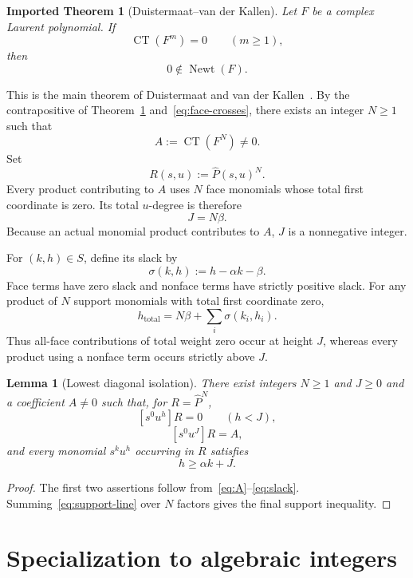 \documentclass[11pt]{article}
\newtheorem{lemma}[theorem]{Lemma}
\newtheorem{imported}[theorem]{Imported Theorem}
\theoremstyle{remark}
\newcommand{\CT}{\operatorname{CT}}
\newcommand{\Newt}{\operatorname{Newt}}
\begin{document}
\begin{imported}[Duistermaat--van der Kallen]\label{thm:DvK}
Let $F$ be a complex Laurent polynomial. If
\[
\CT(F^m)=0
\qquad(m\ge1),
\]
then
\[
0\notin\Newt(F).
\]
\end{imported}

This is the main theorem of Duistermaat and van der Kallen~\cite{DvK}. By the contrapositive of Theorem~\ref{thm:DvK} and~\eqref{eq:face-crosses}, there exists an integer $N\ge1$ such that
\begin{equation}\label{eq:A}
A
:=
\CT(F^N)
\ne0.
\end{equation}
Set
\begin{equation}\label{eq:R}
R(s,u):=\widehat P(s,u)^N.
\end{equation}
Every product contributing to $A$ uses $N$ face monomials whose total first coordinate is zero. Its total $u$-degree is therefore
\begin{equation}\label{eq:J}
J=N\beta.
\end{equation}
Because an actual monomial product contributes to $A$, $J$ is a nonnegative integer.

For $(k,h)\in S$, define its slack by
\[
\sigma(k,h):=h-\alpha k-\beta.
\]
Face terms have zero slack and nonface terms have strictly positive slack. For any product of $N$ support monomials with total first coordinate zero,
\begin{equation}\label{eq:slack}
h_{\mathrm{total}}
=
N\beta+\sum_i\sigma(k_i,h_i).
\end{equation}
Thus all-face contributions of total weight zero occur at height $J$, whereas every product using a nonface term occurs strictly above $J$.

\begin{lemma}[Lowest diagonal isolation]\label{lem:face}
There exist integers $N\ge1$ and $J\ge0$ and a coefficient $A\ne0$ such that, for $R=\widehat P^N$,
\[
[s^0u^h]R=0
\qquad(h<J),
\]
\[
[s^0u^J]R=A,
\]
and every monomial $s^ku^h$ occurring in $R$ satisfies
\[
h\ge \alpha k+J.
\]
\end{lemma}

\begin{proof}
The first two assertions follow from~\eqref{eq:A}--\eqref{eq:slack}. Summing~\eqref{eq:support-line} over $N$ factors gives the final support inequality.
\end{proof}

\section{Specialization to algebraic integers}
\end{document}
